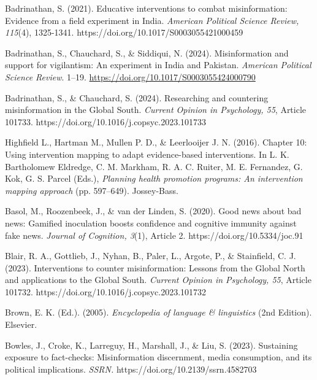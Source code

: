 \documentclass[authordate, empirical]{jote-new-article}
\begin{document}
	Badrinathan, S. (2021). Educative interventions to combat misinformation: Evidence from a field experiment in India. \emph{American Political Science Review, 115}(4), 1325-1341. https://doi.org/10.1017/S0003055421000459



	Badrinathan, S., Chauchard, S., \& Siddiqui, N. (2024). Misinformation and support for vigilantism: An experiment in India and Pakistan. \emph{American Political Science Review}. 1--19. \href{https://doi.org/10.1017/S0003055424000790}{https://doi.org/10.1017/S0003055424000790}



	Badrinathan, S., \& Chauchard, S. (2024). Researching and countering misinformation in the Global South. \emph{Current Opinion in Psychology, 55}, Article 101733. https://doi.org/10.1016/j.copsyc.2023.101733



	Highfield L., Hartman M., Mullen P. D., \& Leerlooijer J. N. (2016). Chapter 10: Using intervention mapping to adapt evidence-based interventions. In L. K. Bartholomew Eldredge, C. M. Markham, R. A. C. Ruiter, M. E. Fernandez, G. Kok, G. S. Parcel (Eds.), \emph{Planning health promotion programs: An intervention mapping approach} (pp. 597--649). Jossey-Bass.



	Basol, M., Roozenbeek, J., \& van der Linden, S. (2020). Good news about bad news: Gamified inoculation boosts confidence and cognitive immunity against fake news. \emph{Journal of Cognition, 3}(1), Article 2. https://doi.org/10.5334/joc.91



	Blair, R. A., Gottlieb, J., Nyhan, B., Paler, L., Argote, P., \& Stainfield, C. J. (2023). Interventions to counter misinformation: Lessons from the Global North and applications to the Global South. \emph{Current Opinion in Psychology, 55}, Article 101732. https://doi.org/10.1016/j.copsyc.2023.101732



	Brown, E. K. (Ed.). (2005). \emph{Encyclopedia of language \& linguistics} (2nd Edition). Elsevier.



	Bowles, J., Croke, K., Larreguy, H., Marshall, J., \& Liu, S. (2023). Sustaining exposure to fact-checks: Misinformation discernment, media consumption, and its political implications. \emph{SSRN. }https://doi.org/10.2139/ssrn.4582703
\end{document}
